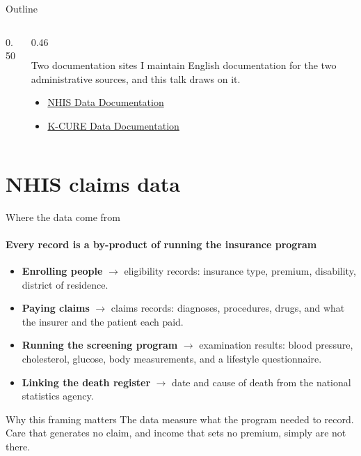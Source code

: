\documentclass[aspectratio=169,11pt]{beamer}
\newcommand{\hl}[1]{\textbf{\color{kdgreen}#1}}
\begin{document}
\begin{frame}{Outline}
  \vspace{14pt}
  \begin{columns}[T]
    \begin{column}{0.50\textwidth}
      \large
      \tableofcontents
    \end{column}
    \begin{column}{0.46\textwidth}
      \begin{block}{Two documentation sites}
        I maintain English documentation for the two administrative sources,
        and this talk draws on it.
        \vspace{4pt}
        \begin{itemize}\small
          \item \href{https://siho-park.github.io/nhis-documentation/}{NHIS Data Documentation}
          \item \href{https://siho-park.github.io/kcure-documentation/}{K-CURE Data Documentation}
        \end{itemize}
      \end{block}
    \end{column}
  \end{columns}
\end{frame}

\section{NHIS claims data}

\begin{frame}{Where the data come from}
  \framesubtitle{Every record is a by-product of running the insurance program}
  \begin{itemize}
    \setlength{\itemsep}{8pt}
    \item \hl{Enrolling people} $\rightarrow$ eligibility records: insurance type, premium,
          disability, district of residence.
    \item \hl{Paying claims} $\rightarrow$ claims records: diagnoses, procedures, drugs, and
          what the insurer and the patient each paid.
    \item \hl{Running the screening program} $\rightarrow$ examination results: blood pressure,
          cholesterol, glucose, body measurements, and a lifestyle questionnaire.
    \item \hl{Linking the death register} $\rightarrow$ date and cause of death from the
          national statistics agency.
  \end{itemize}
  \vspace{4pt}
  \begin{block}{Why this framing matters}
    The data measure what the program needed to record. Care that generates no
    claim, and income that sets no premium, simply are not there.
  \end{block}
\end{frame}
\end{document}
